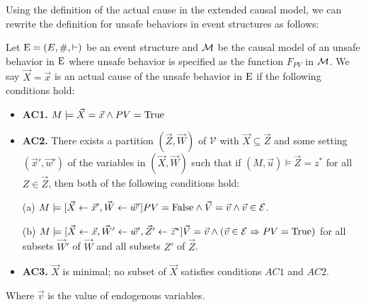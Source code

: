 Using the definition of the actual cause in the extended causal 
model, we can rewrite the definition for unsafe behaviors in 
event structures as follows:

\begin{definition}
    Let $\mathrm{E} = (E,\#,\vdash)$ be an event structure and
    $\mathcal{M}$ be the causal model of an unsafe behavior in
    $\mathrm{E}$ where unsafe behavior is specified as the
    function $F_{PV}$ in $\mathcal{M}$.
    We say $\vec X = \vec x$ is an actual cause of 
    the unsafe behavior in $\mathrm{E}$ if the following
    conditions hold:
    \begin{itemize}
        \item  \textbf{AC1.} $M\models \vec X = \vec x
                  \wedge PV = \mathrm{True}$
        \item  \textbf{AC2. }There exists a partition $(\vec Z, \vec W)$ of $\mathcal{V}$ with $\vec X \subseteq \vec Z$ and some setting $(\vec x',\vec w')$ of the variables in $(\vec X,\vec W)$ such that if $(M,\vec u)\models \vec Z = z^*$ for all $Z\in \vec Z$, then both of the following conditions hold:

              (a) $M \models[\vec X \leftarrow \vec x', \vec W \leftarrow \vec w']
                  PV = \mathrm{False}
                  \wedge \vec V = \vec v
                  \wedge  \vec v \in \mathcal{E}$.

              (b) $M \models[\vec X\leftarrow \vec x, \vec W' \leftarrow \vec w', \vec Z'\leftarrow \vec z^*]
                  \vec V = \vec v
                  \wedge 
                  (\vec v \in \mathcal{E} \Rightarrow PV = \mathrm{True})
                  $
              for all subsets $\vec W'$ of $\vec W$ and all subsets $Z'$ of $\vec Z$.

        \item  \textbf{AC3.} $\vec X$ is minimal; no subset of $\vec X$ satisfies conditions $AC1$ and $AC2$.
    \end{itemize}
    Where $\vec v$ is the value of endogenous variables.
\end{definition}
\pagebreak

